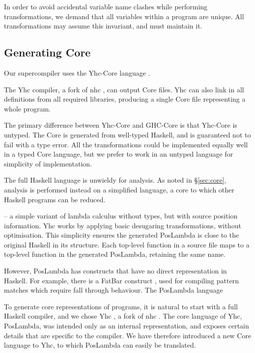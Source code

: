 In order to avoid accidental variable name clashes while performing transformations, we demand that all variables within a program are unique. All transformations may assume this invariant, and must maintain it.

\subsection{Generating Core}

Our supercompiler uses the Yhc-Core language \cite{me:yhc_core}.

The Yhc compiler, a fork of nhc \cite{nhc}, can output Core files. Yhc can also link in all definitions from all required libraries, producing a single Core file representing a whole program.

The primary difference between Yhc-Core and GHC-Core \cite{ghc_core} is that Yhc-Core is untyped. The Core is generated from well-typed Haskell, and is guaranteed not to fail with a type error. All the transformations could be implemented equally well in a typed Core language, but we prefer to work in an untyped language for simplicity of implementation.

The full Haskell language is unwieldy for analysis. As noted in \S\ref{sec:core}, analysis is performed instead on a simplified language, a core to which other Haskell programs can be reduced.

-- a simple variant of lambda calculus without types, but with source position information. Yhc works by applying basic desugaring transformations, without optimisation. This simplicity ensures the generated PosLambda is close to the original Haskell in its structure. Each top-level function in a source file maps to a top-level function in the generated PosLambda, retaining the same name.

However, PosLambda has constructs that have no direct representation in Haskell. For example, there is a FatBar construct \cite{spj:implementation}, used for compiling pattern matches which require fall through behaviour. The PosLambda language

To generate core representations of programs, it is natural to start with a full Haskell compiler, and we chose Yhc \citep{me:yhc_core}, a fork of nhc \citep{nhc}. The core language of Yhc, PosLambda, was intended only as an internal representation, and exposes certain details that are specific to the compiler. We have therefore introduced a new Core language to Yhc, to which PosLambda can easily be translated.


